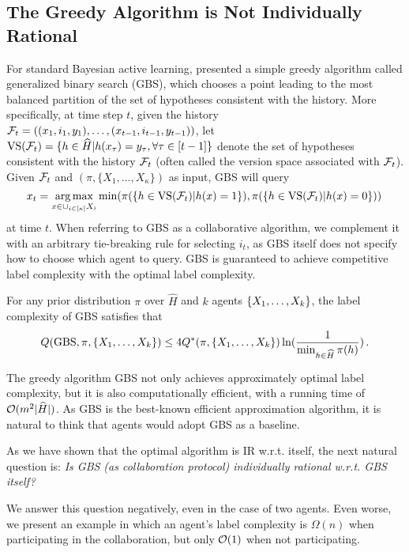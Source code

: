 \subsection{The Greedy Algorithm is Not Individually Rational}\label{subsec:ir-greedy}
\vspace{-0.5em}

For standard Bayesian active learning, \cite{kosaraju2002optimal,dasgupta2004analysis} presented a simple greedy algorithm called generalized binary search (GBS), which chooses a point leading to the most balanced partition of the set of hypotheses consistent with the history. 
More specifically, at time step $t$, given the history $\mathcal{F}_t =((x_1, i_1,y_1),\ldots,(x_{t-1},i_{t-1},y_{t-1}))$, let $\mathrm{VS}(\mathcal{F}_t) = \{h\in \widehat H|h(x_\tau) = y_\tau,\forall \tau\in [t-1]\}$ denote the set of hypotheses consistent with the history $\mathcal{F}_t$ (often called the version space associated with $\mathcal{F}_t$).
Given $\mathcal{F}_t$ and $(\pi, \{X_1,\ldots,X_\kappa\})$ as input, GBS will query 
\[x_t = \operatorname*{arg\,max}_{x\in \cup_{i\in [\kappa]}X_i} \min(\pi(\{h\in \mathrm{VS}(\mathcal{F}_t)|h(x)=1\}), \pi(\{h\in \mathrm{VS}(\mathcal{F}_t)|h(x)=0\}))\,\]
at time $t$. When referring to GBS as a collaborative algorithm, we complement it with an arbitrary tie-breaking rule for selecting $i_t$, as GBS itself does not specify how to choose which agent to query.
GBS is guaranteed to achieve competitive label complexity with the optimal label complexity.

\begin{lemma}\label{lemma:gbs}
    For any prior distribution $\pi$ over $\hat H$ and $k$ agents $\{X_1,\ldots,X_k\}$, the label complexity of GBS satisfies that
    \[Q(\textrm{GBS},\pi,\{X_1,\ldots,X_k\}) \leq 4Q^*(\pi,\{X_1,\ldots,X_k\}) \ln(\frac{1}{\min_{h\in \widehat H} \pi(h)})\,.\]
\end{lemma}
The greedy algorithm GBS not only achieves approximately optimal label complexity, but it is also computationally efficient, with a running time of $\mathcal{O}(m^2|\widehat H|)$. 
As GBS is the best-known efficient approximation algorithm, it is natural to think that agents would adopt GBS as a baseline. 

As we have shown that the optimal algorithm is IR w.r.t. itself, the next natural question is: \textit{Is GBS (as collaboration protocol) individually rational w.r.t. GBS itself? }

We answer this question negatively, even in the case of two agents.
Even worse, we present an example in which an agent's label complexity is $\Omega(n)$ when participating in the collaboration, but only $\mathcal{O}(1)$ when not participating.



